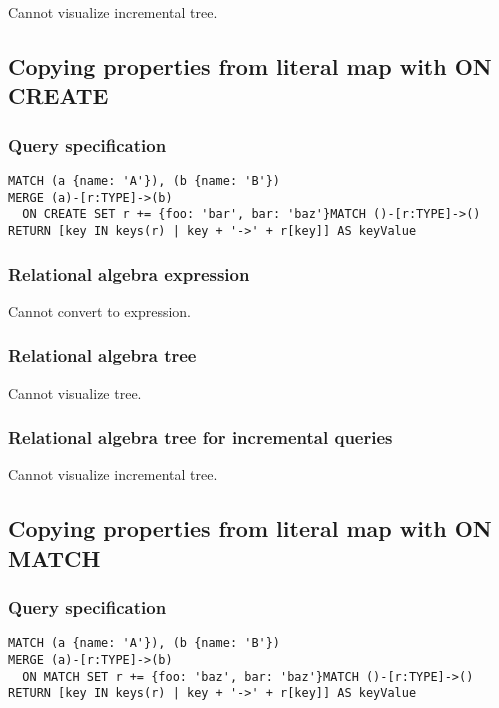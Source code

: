 Cannot visualize incremental tree.

\subsection{Copying properties from literal map with ON CREATE}

\subsubsection*{Query specification}

\begin{lstlisting}
MATCH (a {name: 'A'}), (b {name: 'B'})
MERGE (a)-[r:TYPE]->(b)
  ON CREATE SET r += {foo: 'bar', bar: 'baz'}MATCH ()-[r:TYPE]->()
RETURN [key IN keys(r) | key + '->' + r[key]] AS keyValue
\end{lstlisting}

\subsubsection*{Relational algebra expression}

Cannot convert to expression.

\subsubsection*{Relational algebra tree}

Cannot visualize tree.

\subsubsection*{Relational algebra tree for incremental queries}

Cannot visualize incremental tree.

\subsection{Copying properties from literal map with ON MATCH}

\subsubsection*{Query specification}

\begin{lstlisting}
MATCH (a {name: 'A'}), (b {name: 'B'})
MERGE (a)-[r:TYPE]->(b)
  ON MATCH SET r += {foo: 'baz', bar: 'baz'}MATCH ()-[r:TYPE]->()
RETURN [key IN keys(r) | key + '->' + r[key]] AS keyValue
\end{lstlisting}


